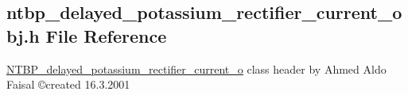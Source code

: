 \subsection{ntbp\_\-delayed\_\-potassium\_\-rectifier\_\-current\_\-obj.h File Reference}
\label{ntbp__delayed__potassium__rectifier__current__obj_8h}



\begin{DoxyItemize}
\item \hyperlink{class_n_t_b_p__delayed__potassium__rectifier__current__o}{NTBP\_\-delayed\_\-potassium\_\-rectifier\_\-current\_\-o} class header by Ahmed Aldo Faisal \copyright created 16.3.2001 
\end{DoxyItemize} 


